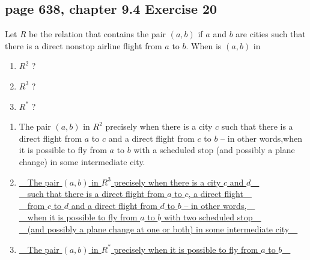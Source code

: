 \documentclass[sigconf]{acmart}
\begin{document}
\subsection{page 638, chapter 9.4 Exercise 20}
\begin{shaded}
    Let \textsl{R} be the relation that contains the pair $(a, b)$ if $a$ and $b$ are cities such that there is a direct nonstop airline flight from $a$ to $b$. When is $(a, b)$ in
    \begin{enumerate}[label=(\alph*)]
        \item $R^2$ ?
    	\item $R^3$ ?
    	\item $R^*$ ?
    \end{enumerate}
\end{shaded}
\begin{enumerate}[label=(\alph*)]
    \item The pair $(a,b)$ in $R^2$ precisely when there is a city $c$ such that there is a direct flight from $a$ to $c$ and a direct flight from $c$ to $b$ -- in other words,when it is possible to fly from $a$ to $b$ with a scheduled stop (and possibly a plane change) in some intermediate city.
	\item \underline{~~The pair $(a,b)$ in $R^3$ precisely when there is a city $c$ and $d$~~}\\
	\underline{~~such that there is a direct flight from $a$ to $c$, a direct flight~~}\\
	\underline{~~from $c$ to $d$ and a direct flight from $d$ to $b$ -- in other words,~~}\\
	\underline{~~when it is possible to fly from $a$ to $b$ with two scheduled stop~~}\\
	\underline{~~(and possibly a plane change at one or both) in some intermediate city~~}
	\item \underline{~~The pair $(a,b)$ in $R^*$ precisely when it is possible to fly from $a$ to $b$~~}
\end{enumerate}
\end{document}
